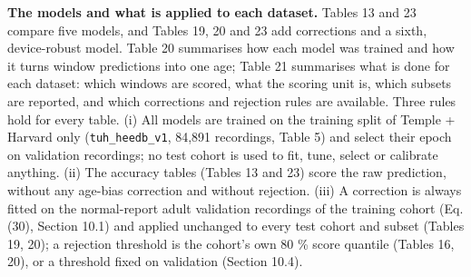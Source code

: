 \documentclass[11pt,a4paper]{article}
\begin{document}
\textbf{The models and what is applied to each dataset.} Tables 13 and 23 compare five models, and Tables 19, 20 and 23 add corrections and a sixth, device-robust model. Table 20 summarises how each model was trained and how it turns window predictions into one age; Table 21 summarises what is done for each dataset: which windows are scored, what the scoring unit is, which subsets are reported, and which corrections and rejection rules are available. Three rules hold for every table. (i) All models are trained on the training split of Temple + Harvard only (\texttt{tuh\_heedb\_v1}, 84,891 recordings, Table 5) and select their epoch on validation recordings; no test cohort is used to fit, tune, select or calibrate anything. (ii) The accuracy tables (Tables 13 and 23) score the raw prediction, without any age-bias correction and without rejection. (iii) A correction is always fitted on the normal-report adult validation recordings of the training cohort (Eq. (30), Section 10.1) and applied unchanged to every test cohort and subset (Tables 19, 20); a rejection threshold is the cohort's own 80 \% score quantile (Tables 16, 20), or a threshold fixed on validation (Section 10.4).
\end{document}
